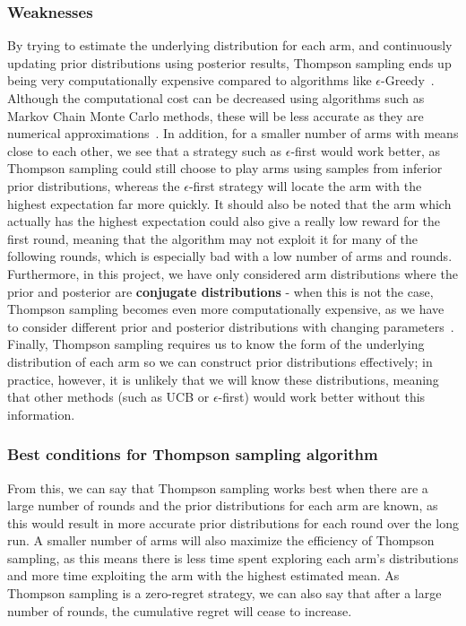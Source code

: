 \subsubsection{Weaknesses}
By trying to estimate the underlying distribution for each arm, and continuously updating prior distributions using posterior results, Thompson sampling ends up being very computationally expensive compared to algorithms like $\epsilon$-Greedy~\citep{mazumdar2020thompson}.
Although the computational cost can be decreased using algorithms such as Markov Chain Monte Carlo methods, these will be less accurate as they are numerical approximations~\citep{mazumdar2020thompson}.
In addition, for a smaller number of arms with means close to each other, we see that a strategy such as $\epsilon$-first would work better, as Thompson sampling could still choose to play arms using samples from inferior prior distributions, whereas the $\epsilon$-first strategy will locate the arm with the highest expectation far more quickly.
It should also be noted that the arm which actually has the highest expectation could also give a really low reward for the first round, meaning that the algorithm may not exploit it for many of the following rounds, which is especially bad with a low number of arms and rounds.
Furthermore, in this project, we have only considered arm distributions where the prior and posterior are \textbf{conjugate distributions} - when this is not the case, Thompson sampling becomes even more computationally expensive, as we have to consider different prior and posterior distributions with changing parameters~\citep{zhou2018racing}.
Finally, Thompson sampling requires us to know the form of the underlying distribution of each arm so we can construct prior distributions effectively; 
in practice, however, it is unlikely that we will know these distributions, meaning that other methods (such as UCB or $\epsilon$-first) would work better without this information.

\subsubsection{Best conditions for Thompson sampling algorithm}
From this, we can say that Thompson sampling works best when there are a large number of rounds and the prior distributions for each arm are known, as this would result in more accurate prior distributions for each round over the long run.
A smaller number of arms will also maximize the efficiency of Thompson sampling, as this means there is less time spent exploring each arm's distributions and more time exploiting the arm with the highest estimated mean.
As Thompson sampling is a zero-regret strategy, we can also say that after a large number of rounds, the cumulative regret will cease to increase.

